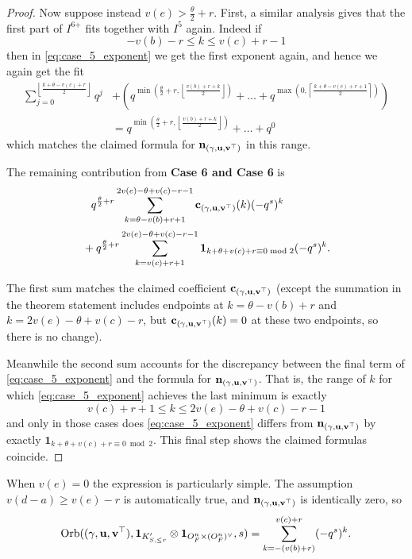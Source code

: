 \begin{proof}
  Now suppose instead $v(e) > \frac{\theta}{2} + r$.
  First, a similar analysis gives that the first part of $I^{\text{6+}}$ fits
  together with $I^{\text{5}}$ again.
  Indeed if
  \[ -v(b) - r \le k \le v(c) + r - 1 \]
  then in \eqref{eq:case_5_exponent} we get the first exponent again, and hence
  we again get the fit
  \begin{align*}
    \sum_{j=0}^{\left\lfloor \frac{k+\theta-v(c)+r}{2} \right\rfloor} q^j
    &+
    \left(
    q^{\min\left( \frac{\theta}{2} + r, \left\lfloor \frac{v(b) + r + k}{2} \right\rfloor \right)}
    + \dots
    + q^{\max\left(0, \left\lceil \frac{k + \theta - v(c) + r + 1}{2} \right\rceil \right)}
    \right) \\
    &=
    q^{\min(\frac{\theta}{2}+r, \left\lfloor \frac{v(b) + r + k}{2} \right\rfloor)} + \dots + q^0
  \end{align*}
  which matches the claimed formula for $\mathbf n_{(\gamma, \mathbf u, \mathbf v^\top)}$ in this range.

  The remaining contribution from \textbf{Case 6\ts{+} and Case 6\ts{-}} is
  \begin{align*}
  &\phantom+ q^{\frac{\theta}{2} + r}
  \sum_{k = \theta - v(b) + r + 1}^{2v(e) - \theta + v(c) - r - 1} \cc_\guv(k)(-q^s)^k \\
  &+ q^{\frac{\theta}{2} + r}
  \sum_{k = v(c) + r + 1}^{2v(e) - \theta + v(c) - r - 1}
  \mathbf{1}_{k + \theta + v(c) + r \equiv 0 \bmod 2} (-q^s)^k.
  \end{align*}

  The first sum matches the claimed coefficient $\mathbf c_{(\gamma, \mathbf u, \mathbf v^\top)}$
  (except the summation in the theorem statement includes
  endpoints at $k = \theta - v(b) + r$
  and $k = 2v(e) - \theta + v(c) - r$,
  but $\mathbf c_{(\gamma, \mathbf u, \mathbf v^\top)}(k) = 0$ at these two endpoints,
  so there is no change).

  Meanwhile the second sum accounts for the discrepancy between
  the final term of \eqref{eq:case_5_exponent} and the formula for $\mathbf n_{(\gamma, \mathbf u, \mathbf v^\top)}$.
  That is, the range of $k$ for which \eqref{eq:case_5_exponent}
  achieves the last minimum is exactly
  \[ v(c) + r + 1 \le k \le 2v(e) - \theta + v(c) - r - 1 \]
  and only in those cases does \eqref{eq:case_5_exponent}
  differs from $\mathbf n_{(\gamma, \mathbf u, \mathbf v^\top)}$ by exactly
  $\mathbf{1}_{k + \theta + v(c) + r \equiv 0 \bmod 2}$.
  This final step shows the claimed formulas coincide.
\end{proof}

\begin{example}
  When $v(e) = 0$ the expression is particularly simple.
  The assumption $v(d-a) \ge v(e)-r$ is automatically true, and
  $\mathbf n_{{(\gamma, \mathbf u, \mathbf v^\top)}}$ is identically zero, so
  \[ \operatorname{Orb}({(\gamma, \mathbf u, \mathbf v^\top)}, \mathbf{1}_{K'_{S, \le r}} \otimes \mathbf{1}_{O_F^n \times (O_F^n)^\vee}, s)
    = \sum_{k=-(v(b)+r)}^{v(c)+r} (-q^s)^k. \]
\end{example}

